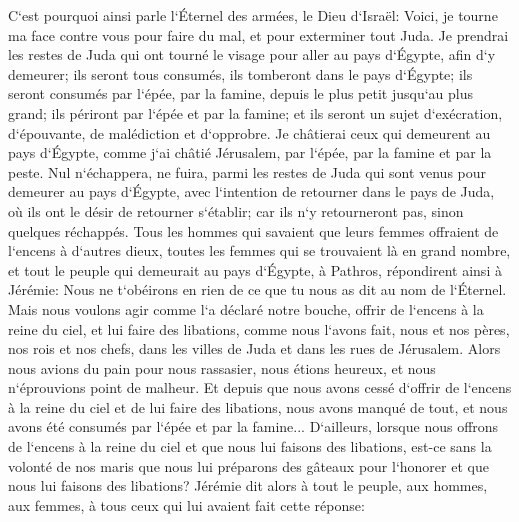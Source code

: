 \verse C`est pourquoi ainsi parle l`Éternel des armées, le Dieu d`Israël: Voici, je tourne ma face contre vous pour faire du mal, et pour exterminer tout Juda. 
\verse Je prendrai les restes de Juda qui ont tourné le visage pour aller au pays d`Égypte, afin d`y demeurer; ils seront tous consumés, ils tomberont dans le pays d`Égypte; ils seront consumés par l`épée, par la famine, depuis le plus petit jusqu`au plus grand; ils périront par l`épée et par la famine; et ils seront un sujet d`exécration, d`épouvante, de malédiction et d`opprobre. 
\verse Je châtierai ceux qui demeurent au pays d`Égypte, comme j`ai châtié Jérusalem, par l`épée, par la famine et par la peste. 
\verse Nul n`échappera, ne fuira, parmi les restes de Juda qui sont venus pour demeurer au pays d`Égypte, avec l`intention de retourner dans le pays de Juda, où ils ont le désir de retourner s`établir; car ils n`y retourneront pas, sinon quelques réchappés. 
\verse Tous les hommes qui savaient que leurs femmes offraient de l`encens à d`autres dieux, toutes les femmes qui se trouvaient là en grand nombre, et tout le peuple qui demeurait au pays d`Égypte, à Pathros, répondirent ainsi à Jérémie: 
\verse Nous ne t`obéirons en rien de ce que tu nous as dit au nom de l`Éternel. 
\verse Mais nous voulons agir comme l`a déclaré notre bouche, offrir de l`encens à la reine du ciel, et lui faire des libations, comme nous l`avons fait, nous et nos pères, nos rois et nos chefs, dans les villes de Juda et dans les rues de Jérusalem. Alors nous avions du pain pour nous rassasier, nous étions heureux, et nous n`éprouvions point de malheur. 
\verse Et depuis que nous avons cessé d`offrir de l`encens à la reine du ciel et de lui faire des libations, nous avons manqué de tout, et nous avons été consumés par l`épée et par la famine... 
\verse D`ailleurs, lorsque nous offrons de l`encens à la reine du ciel et que nous lui faisons des libations, est-ce sans la volonté de nos maris que nous lui préparons des gâteaux pour l`honorer et que nous lui faisons des libations? 
\verse Jérémie dit alors à tout le peuple, aux hommes, aux femmes, à tous ceux qui lui avaient fait cette réponse: 
